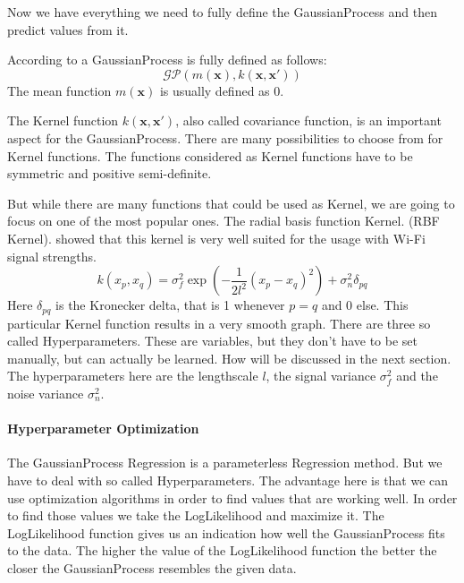 Now we have everything we need to fully define the \Gls{GaussianProcess} and then predict values from it. 

According to \citet[p.\ 13]{Rasmussen:2005:GPM:1162254} a \Gls{GaussianProcess} is fully defined as follows:
\begin{equation}\label{eq:GP}
\mathcal{GP}(m(\mathbf{x}),k(\mathbf{x},\mathbf{x'}))
\end{equation}
The mean function $m(\mathbf{x})$ is usually defined as 0. 

The \gls{Kernel} function $k(\mathbf{x},\mathbf{x'})$, also called covariance function, is an important aspect for the \Gls{GaussianProcess}. There are many possibilities to choose from for \gls{Kernel} functions. The functions considered as \gls{Kernel} functions have to be symmetric and positive semi-definite. 

But while there are many functions that could be used as \gls{Kernel}, we are going to focus on one of the most popular ones. The radial basis function \gls{Kernel}. (RBF \gls{Kernel}). \citet{ferris2006gaussian} showed that this kernel is very well suited for the usage with Wi-Fi signal strengths. 
\begin{equation}\label{eq:rbf}
k(x_p,x_q) = \sigma_f^2\exp(-\dfrac{1}{2l^2}(x_p-x_q)^2)+\sigma_n^2\delta_{pq}
\end{equation} 
Here $\delta_{pq}$ is the Kronecker delta, that is 1 whenever $p=q$ and 0 else. This particular \gls{Kernel} function results in a very smooth graph. There are three so called \gls{Hyperparameter}s. These are variables, but they don't have to be set manually, but can actually be learned. How will be discussed in the next section. 
The hyperparameters here are the lengthscale $l$, the signal variance $\sigma_f^2$ and the noise variance $\sigma_n^2$. 

\paragraph{Hyperparameter Optimization}
The \Gls{GaussianProcess} \gls{Regression} is a parameterless \gls{Regression} method. But we have to deal with so called \gls{Hyperparameter}s. The advantage here is that we can use optimization algorithms in order to find values that are working well. In order to find those values we take the \gls{LogLikelihood} and maximize it. The \gls{LogLikelihood} function gives us an indication how well the \Gls{GaussianProcess} fits to the data. The higher the value of the \gls{LogLikelihood} function the better the closer the \Gls{GaussianProcess} resembles the given data.

